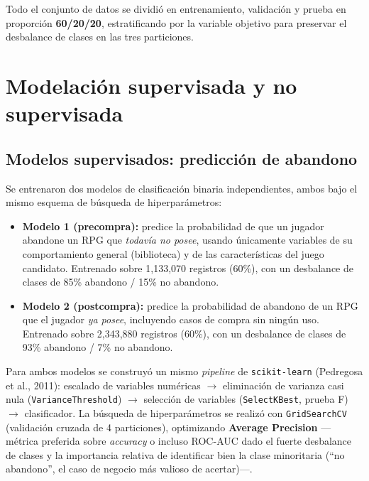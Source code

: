 \documentclass[11pt,letterpaper]{article}
\newcommand{\code}[1]{\texttt{\small #1}}
\begin{document}
Todo el conjunto de datos se dividió en entrenamiento, validación y prueba en proporción \textbf{60/20/20}, estratificando por la variable objetivo para preservar el desbalance de clases en las tres particiones.

\section{Modelación supervisada y no supervisada}
\label{sec:modelacion}

\subsection{Modelos supervisados: predicción de abandono}

Se entrenaron dos modelos de clasificación binaria independientes, ambos bajo el mismo esquema de búsqueda de hiperparámetros:

\begin{itemize}
  \item \textbf{Modelo 1 (precompra):} predice la probabilidad de que un jugador abandone un RPG que \emph{todavía no posee}, usando únicamente variables de su comportamiento general (biblioteca) y de las características del juego candidato. Entrenado sobre 1{,}133{,}070 registros (60\%), con un desbalance de clases de 85\% abandono / 15\% no abandono.
  \item \textbf{Modelo 2 (postcompra):} predice la probabilidad de abandono de un RPG que el jugador \emph{ya posee}, incluyendo casos de compra sin ningún uso. Entrenado sobre 2{,}343{,}880 registros (60\%), con un desbalance de clases de 93\% abandono / 7\% no abandono.
\end{itemize}

Para ambos modelos se construyó un mismo \textit{pipeline} de \code{scikit-learn} (Pedregosa et al., 2011): escalado de variables numéricas $\rightarrow$ eliminación de varianza casi nula (\code{VarianceThreshold}) $\rightarrow$ selección de variables (\code{SelectKBest}, prueba F) $\rightarrow$ clasificador. La búsqueda de hiperparámetros se realizó con \code{GridSearchCV} (validación cruzada de 4 particiones), optimizando \textbf{Average Precision} ---métrica preferida sobre \textit{accuracy} o incluso ROC-AUC dado el fuerte desbalance de clases y la importancia relativa de identificar bien la clase minoritaria (``no abandono'', el caso de negocio más valioso de acertar)---.
\end{document}
